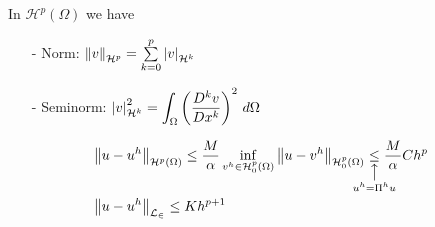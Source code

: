 \begin{remark}
  In $\mathcal{H}^p(\Omega)$ we have \begin{itemize}
      \item[-] Norm: $\left\lVert v\right\rVert_{\mathcal{H}^p} = \sum\limits_{k=0}^p \left\vert v \right\vert_{\mathcal{H}^k}$
      \item[-] Seminorm: $\displaystyle{\left\vert v \right\vert_{\mathcal{H}^k}^2 = \int_{\Omega}\left(\frac{D^kv}{Dx^k}\right)^2\, d\Omega}$
  \end{itemize}
\end{remark}

\begin{corollary}
  \begin{align*}
      &\norm{u-u^h}_{\mathcal{H}^p(\Omega)} \leq \frac{M}{\alpha}\inf_{v^h\in\mathcal{H}_0^p(\Omega)}\norm{u-v^h}_{\mathcal{H}_0^p(\Omega)} \hspace{-0.4cm}\underset{\substack{\big\uparrow \\ u^h = \Pi^hu}}{\leq} \hspace{-0.4cm}\frac{M}{\alpha} Ch^p\\
      &\norm{u-u^h}_{\mathcal{L_2}} \leq Kh^{p+1}
  \end{align*}
\end{corollary}





















